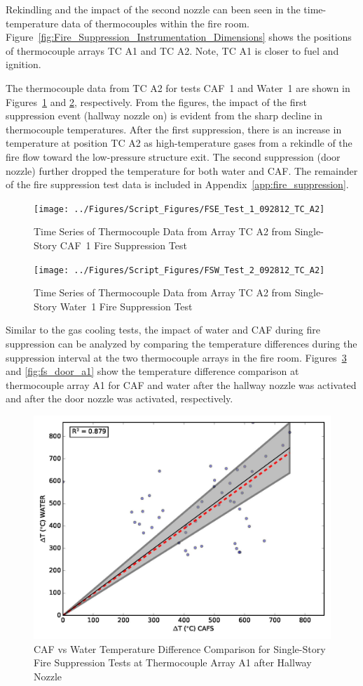 \documentclass[12pt,oneside]{book}
\begin{document}
Rekindling and the impact of the second nozzle can been seen in the time-temperature data of thermocouples within the fire room. Figure~\ref{fig:Fire_Suppression_Instrumentation_Dimensions} shows the positions of thermocouple arrays TC A1 and TC A2. Note, TC A1 is closer to fuel and ignition.

The thermocouple data from TC A2 for tests CAF~1 and Water~1 are shown in Figures~\ref{fig:caf1_tca2} and \ref{fig:water1_tca2}, respectively. From the figures, the impact of the first suppression event (hallway nozzle on) is evident from the sharp decline in thermocouple temperatures. After the first suppression, there is an increase in temperature at position TC A2 as high-temperature gases from a rekindle of the fire flow toward the low-pressure structure exit. The second suppression (door nozzle) further dropped the temperature for both water and CAF. The remainder of the fire suppression test data is included in Appendix~\ref{app:fire_suppression}.

\begin{figure}[!ht]
	\texttt{[image: ../Figures/Script\_Figures/FSE\_Test\_1\_092812\_TC\_A2]}
	\caption{Time Series of Thermocouple Data from Array TC A2 from Single-Story CAF~1 Fire Suppression Test}
	\label{fig:caf1_tca2}
\end{figure}

\begin{figure}[!ht]
	\texttt{[image: ../Figures/Script\_Figures/FSW\_Test\_2\_092812\_TC\_A2]}
	\caption{Time Series of Thermocouple Data from Array TC A2 from Single-Story Water~1 Fire Suppression Test}
	\label{fig:water1_tca2}
\end{figure}

Similar to the gas cooling tests, the impact of water and CAF during fire suppression can be analyzed by comparing the temperature differences during the suppression interval at the two thermocouple arrays in the fire room. Figures~\ref{fig:fs_hall_a1} and \ref{fig:fs_door_a1} show the temperature difference comparison at thermocouple array A1 for CAF and water after the hallway nozzle was activated and after the door nozzle was activated, respectively. 

\begin{figure}[!ht]
	\includegraphics[width=.7\columnwidth]{../Figures/Script_Figures/TCA1_hallnozzle_scatter}
	\caption{CAF vs Water Temperature Difference Comparison for Single-Story Fire Suppression Tests at Thermocouple Array A1 after Hallway Nozzle}
	\label{fig:fs_hall_a1}
\end{figure}
\end{document}

